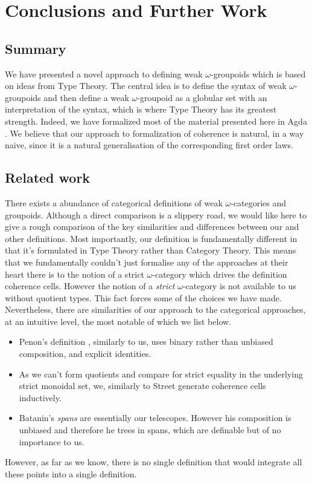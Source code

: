 \section{Conclusions and Further Work}
\label{sec:conclusions}

\subsection{Summary}
We have presented a novel approach to defining weak $\omega$-groupoids
which is based on ideas from Type Theory. The central idea is to
define the syntax of weak $\omega$-groupoids and then define a weak
$\omega$-groupoid as a globular set with an interpretation of the
syntax, which is where Type Theory has its greatest strength. Indeed,
we have formalized most of the material presented here in Agda
\cite{agda}.  We believe that our approach to formalization of
coherence is natural, in a way naive, since it is a natural
generalisation of the corresponding first order laws.

\subsection{Related work}
There exists a abundance of categorical definitions of weak
$\omega$-categories and groupoids.  Although a direct comparison is a
slippery road, we would like here to give a rough comparison of the
key similarities and differences between our and other
definitions. Most importantly, our definition is fundamentally
different in that it's formulated in Type Theory rather than Category
Theory. This means that we fundamentally couldn't just formalise any
of the approaches
\cite{penon:1999,batanin98:monoidal-globular,leinster:2000} at their
heart there is to the notion of a strict $\omega$-category which
drives the definition coherence cells. However the notion of a
\emph{strict} $\omega$-category is not available to us without
quotient types. This fact forces some of the choices we have made.
Nevertheless, there are similarities of our approach to the
categorical approaches, at an intuitive level, the most notable of
which we list below.
\begin{itemize}
\item Penon's definition \cite{penon:1999}, similarly to us, uses
  binary rather than unbiased composition, and explicit
  identities. 
\item As we can't form quotients and compare for strict equality in
  the underlying strict monoidal set, we, similarly to Street
  \cite{street87:simplexes} generate coherence cells
  inductively. 
\item Batanin's \emph{spans} are essentially our telescopes. However
  his composition is unbiased and therefore he trees in spans, which
  are definable but of no importance to us. 
\end{itemize}
%
However, as far as we know, there is no single definition that would
integrate all these points into a single definition. 



